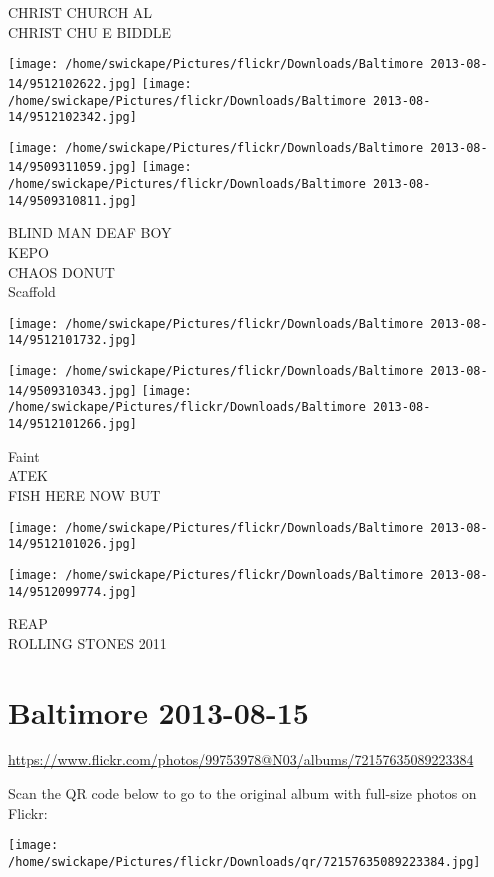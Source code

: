 \documentclass[10pt,letterpaper]{article}
\begin{document}
CHRIST CHURCH AL\\
CHRIST CHU E BIDDLE
\pagebreak

\texttt{[image: /home/swickape/Pictures/flickr/Downloads/Baltimore 2013-08-14/9512102622.jpg]}
\texttt{[image: /home/swickape/Pictures/flickr/Downloads/Baltimore 2013-08-14/9512102342.jpg]}

\texttt{[image: /home/swickape/Pictures/flickr/Downloads/Baltimore 2013-08-14/9509311059.jpg]}
\texttt{[image: /home/swickape/Pictures/flickr/Downloads/Baltimore 2013-08-14/9509310811.jpg]}

BLIND MAN DEAF BOY\\
KEPO\\
CHAOS DONUT\\
Scaffold
\pagebreak

\texttt{[image: /home/swickape/Pictures/flickr/Downloads/Baltimore 2013-08-14/9512101732.jpg]}

\vspace{0.25in}
\texttt{[image: /home/swickape/Pictures/flickr/Downloads/Baltimore 2013-08-14/9509310343.jpg]}
\texttt{[image: /home/swickape/Pictures/flickr/Downloads/Baltimore 2013-08-14/9512101266.jpg]}

Faint\\
ATEK\\
FISH HERE NOW BUT
\pagebreak

\texttt{[image: /home/swickape/Pictures/flickr/Downloads/Baltimore 2013-08-14/9512101026.jpg]}

\vspace{0.25in}
\texttt{[image: /home/swickape/Pictures/flickr/Downloads/Baltimore 2013-08-14/9512099774.jpg]}

REAP\\
ROLLING STONES 2011
\pagebreak

\section*{Baltimore 2013-08-15}

\url{https://www.flickr.com/photos/99753978@N03/albums/72157635089223384}

Scan the QR code below to go to the original album with full-size photos on Flickr:

\texttt{[image: /home/swickape/Pictures/flickr/Downloads/qr/72157635089223384.jpg]}
\pagebreak
\end{document}
